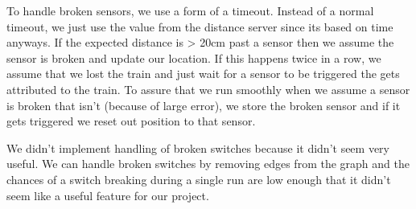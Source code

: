 \documentclass[letterpaper]{article}
\begin{document}
To handle broken sensors, we use a form of a timeout. Instead of a normal timeout, we just use the value from the distance server since its based on time anyways. If the expected distance is > 20cm past a sensor then we assume the sensor is broken and update our location. If this happens twice in a row, we assume that we lost the train and just wait for a sensor to be triggered the gets attributed to the train. To assure that we run smoothly when we assume a sensor is broken that isn't (because of large error), we store the broken sensor and if it gets triggered we reset out position to that sensor.

We didn't implement handling of broken switches because it didn't seem very useful. We can handle broken switches by removing edges from the graph and the chances of a switch breaking during a single run are low enough that it didn't seem like a useful feature for our project.
\end{document}
